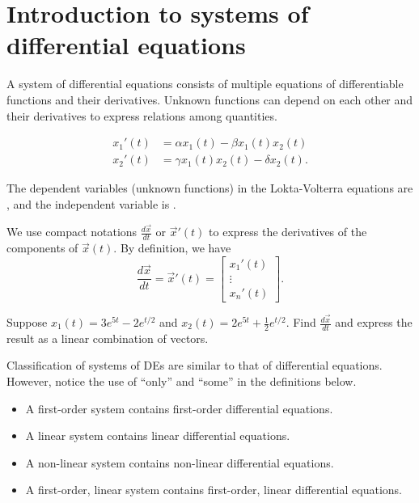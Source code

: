 \documentclass[../main.tex]{subfiles}
\begin{document}
 \section{Introduction to systems of differential equations}

A system of differential equations consists of multiple equations of differentiable functions and their derivatives.  Unknown functions can depend on each other and their derivatives to express relations among quantities.

\begin{example}
  \begin{align*}
    x_{1}'(t) &= \alpha x_{1}(t) - \beta x_{1}(t) x_{2}(t) \\
    x_{2}'(t) &= \gamma x_{1}(t) x_{2}(t) - \delta x_{2}(t).
  \end{align*}

  The dependent variables (unknown functions) in the Lokta-Volterra equations are \underline{\hspace{1in}}, and the independent variable is \underline{\hspace{1cm}}.
\end{example}

We use compact notations \(\frac{d \vec{x}}{dt}\) or \(\vec{x}'(t)\) to express the derivatives of the components of \(\vec{x}(t)\).   By definition, we have
\[
  \frac{d \vec{x}}{dt} = \vec{x}'(t) = \begin{bmatrix} x_{1}'(t) \\ \vdots \\ x_{n}'(t)\end{bmatrix}.
\]


\begin{example}
  Suppose \(x_{1}(t) = 3 e^{5t} -2 e^{t/2}\) and \(x_{2}(t) = 2 e^{5t} + \frac{1}{2}e^{t/2}\). Find \(\frac{d \vec{x}}{dt}\) and express the result as a linear combination of vectors.

\end{example}

Classification of systems of DEs are similar to that of differential equations. However, notice the use of ``only'' and ``some'' in the definitions below.
\begin{itemize}
  \item A first-order system contains  first-order differential equations.
  \item A linear system contains   linear differential equations.
  \item A non-linear system contains  non-linear differential equations.
  \item A first-order, linear system contains  first-order, linear differential equations.
\end{itemize}
\end{document}
